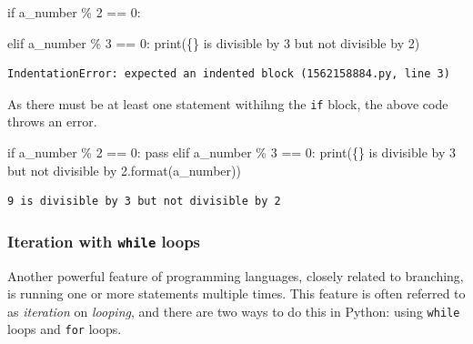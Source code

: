 \documentclass[
  letterpaper,
  DIV=11,
  numbers=noendperiod]{scrreprt}
\newenvironment{Shaded}{\begin{snugshade}}{\end{snugshade}}
\newcommand{\BuiltInTok}[1]{\textcolor[rgb]{0.00,0.23,0.31}{#1}}
\newcommand{\ControlFlowTok}[1]{\textcolor[rgb]{0.00,0.23,0.31}{#1}}
\newcommand{\DecValTok}[1]{\textcolor[rgb]{0.68,0.00,0.00}{#1}}
\newcommand{\NormalTok}[1]{\textcolor[rgb]{0.00,0.23,0.31}{#1}}
\newcommand{\OperatorTok}[1]{\textcolor[rgb]{0.37,0.37,0.37}{#1}}
\newcommand{\SpecialCharTok}[1]{\textcolor[rgb]{0.37,0.37,0.37}{#1}}
\newcommand{\StringTok}[1]{\textcolor[rgb]{0.13,0.47,0.30}{#1}}
\begin{document}
\begin{Shaded}
\begin{Highlighting}[]
\ControlFlowTok{if}\NormalTok{ a\_number }\OperatorTok{\%} \DecValTok{2} \OperatorTok{==} \DecValTok{0}\NormalTok{:}
    
\ControlFlowTok{elif}\NormalTok{ a\_number }\OperatorTok{\%} \DecValTok{3} \OperatorTok{==} \DecValTok{0}\NormalTok{:}
    \BuiltInTok{print}\NormalTok{(}\StringTok{\textquotesingle{}}\SpecialCharTok{\{\}}\StringTok{ is divisible by 3 but not divisible by 2\textquotesingle{}}\NormalTok{)}
\end{Highlighting}
\end{Shaded}

\begin{verbatim}
IndentationError: expected an indented block (1562158884.py, line 3)
\end{verbatim}

As there must be at least one statement withihng the \texttt{if} block,
the above code throws an error.

\begin{Shaded}
\begin{Highlighting}[]
\ControlFlowTok{if}\NormalTok{ a\_number }\OperatorTok{\%} \DecValTok{2} \OperatorTok{==} \DecValTok{0}\NormalTok{:}
    \ControlFlowTok{pass}
\ControlFlowTok{elif}\NormalTok{ a\_number }\OperatorTok{\%} \DecValTok{3} \OperatorTok{==} \DecValTok{0}\NormalTok{:}
    \BuiltInTok{print}\NormalTok{(}\StringTok{\textquotesingle{}}\SpecialCharTok{\{\}}\StringTok{ is divisible by 3 but not divisible by 2\textquotesingle{}}\NormalTok{.}\BuiltInTok{format}\NormalTok{(a\_number))}
\end{Highlighting}
\end{Shaded}

\begin{verbatim}
9 is divisible by 3 but not divisible by 2
\end{verbatim}

\hypertarget{iteration-with-while-loops}{%
\subsubsection{\texorpdfstring{Iteration with \texttt{while}
loops}{Iteration with while loops}}\label{iteration-with-while-loops}}

Another powerful feature of programming languages, closely related to
branching, is running one or more statements multiple times. This
feature is often referred to as \emph{iteration} on \emph{looping}, and
there are two ways to do this in Python: using \texttt{while} loops and
\texttt{for} loops.
\end{document}
